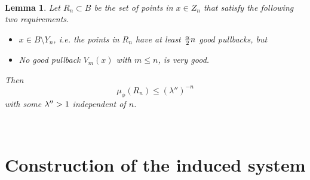 \documentclass[12pt]{amsart}
\numberwithin{equation}{section}
\newcommand{\blem}{\begin{lem}}
\newcommand{\elem}{\end{lem}}
\newtheorem{lem}[thm]{Lemma}
\begin{document}
\

\blem\label{verygood}
Let $R_n\subset B$ be the set of points in $x\in Z_n$ that satisfy the
following two requirements.

\begin{itemize}
\item[(1)]$x\in B\setminus Y_n$, i.e. the points in $R_n$ have
  at least ${\alpha\over 2}n$ good pullbacks, but 
\item[(2)] No good pullback $V_m(x)$ with $m\le n$, is very good. 
\end{itemize}
Then
$$
\mu_\phi(R_n)\le (\lambda'')^{-n}
$$
with some $\lambda''>1$ independent of $n$.
\elem

\

\section{Construction of the induced system}\label{constr}
\end{document}
